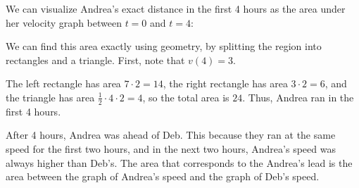 \documentclass[main]{subfiles}
\begin{document}
\begin{enumerate}

  \begin{solution}
    We can visualize Andrea's exact distance in the first 4 hours as the
    area under her velocity graph between $t = 0$ and $t = 4$:
    \begin{center}
    \end{center}
    We can find this area exactly using geometry, by splitting the region
    into rectangles and a triangle.  First, note that $v(4) = 3$.
    \begin{center}
    \end{center}
    The left rectangle has area $7 \cdot 2 = 14$, the right rectangle has
    area $3 \cdot 2 = 6$, and the triangle has area $\frac{1}{2} \cdot 4
    \cdot 2 = 4$, so the total area is $24$.  Thus, Andrea ran
     in the first 4 hours.

    After 4 hours, Andrea was ahead of Deb. This because they ran at the same
    speed for the first two hours, and in the next two hours, Andrea's
    speed was always higher than Deb's. The area that corresponds to the
    Andrea's lead is the area between the graph of Andrea's speed and the
    graph of Deb's speed.
  \end{solution}


\end{enumerate}
\end{document}
